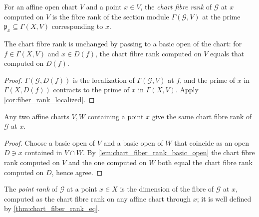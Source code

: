 \begin{definition}
  \label{def:chart_fiber_rank}
  \leanok
  For an affine open chart \(V\) and a point \(x \in V\), the \emph{chart
  fibre rank} of \(\mathcal G\) at \(x\) computed on \(V\) is the fibre rank
  of the section module \(\Gamma(\mathcal G, V)\) at the prime
  \(\mathfrak p_x \subseteq \Gamma(X, V)\) corresponding to \(x\).
\end{definition}

\begin{lemma}
  \label{lem:chart_fiber_rank_basic_open}
  \leanok
  The chart fibre rank is unchanged by passing to a basic open of the chart:
  for \(f \in \Gamma(X, V)\) and \(x \in D(f)\), the chart fibre rank computed
  on \(V\) equals that computed on \(D(f)\).
\end{lemma}

\begin{proof}
  \leanok
  \(\Gamma(\mathcal G, D(f))\) is the localization of
  \(\Gamma(\mathcal G, V)\) at \(f\), and the prime of \(x\) in
  \(\Gamma(X, D(f))\) contracts to the prime of \(x\) in \(\Gamma(X, V)\).
  Apply \cref{cor:fiber_rank_localized}.
\end{proof}

\begin{theorem}
  \label{thm:chart_fiber_rank_eq}
  \leanok
  Any two affine charts \(V, W\) containing a point \(x\) give the same chart
  fibre rank of \(\mathcal G\) at \(x\).
\end{theorem}

\begin{proof}
  \leanok
  Choose a basic open of \(V\) and a basic open of \(W\) that coincide as an
  open \(D \ni x\) contained in \(V \cap W\).  By
  \cref{lem:chart_fiber_rank_basic_open} the chart fibre rank computed on
  \(V\) and the one computed on \(W\) both equal the chart fibre rank computed
  on \(D\), hence agree.
\end{proof}

\begin{definition}
  \label{def:point_rank}
  \leanok
  The \emph{point rank} of \(\mathcal G\) at a point \(x \in X\) is the
  dimension of the fibre of \(\mathcal G\) at \(x\), computed as the chart
  fibre rank on any affine chart through \(x\); it is well defined by
  \cref{thm:chart_fiber_rank_eq}.
\end{definition}

